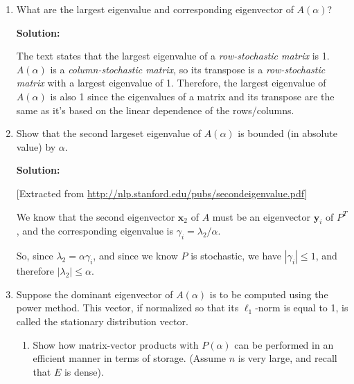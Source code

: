 \documentclass[12pt]{article}
\newcommand{\abs}[1]{\left| #1 \right|}
\newcommand{\vect}{\mathbf}
\begin{document}
\begin{enumerate}
\begin{enumerate}
  {\bf Solution:}

  We can write any arbitrary element of each matrix in the above given equation, giving

  \begin{align*}
    A_{i,j} &= \alpha P_{i,j} + (1 - \alpha) E_{i,j}\\
    \intertext{Now in taking a summation of an arbitrary column from above}
    \sum_{i=1}^{n}A_{i,j} &= \alpha \sum_{i=1}^{n}P_{i,j} + (1-\alpha)\sum_{i=1}^{n}E_{i,j}\\
    &= \alpha + (1 - \alpha) = 1
  \end{align*}

  Which is due to the fact that $E$ and $P$ are column-stochastic matrices.

  \item What are the largest eigenvalue and corresponding eigenvector of $A(\alpha)$?

  {\bf Solution:}

  The text states that the largest eigenvalue of a {\em row-stochastic matrix} is 1. $A(\alpha)$
  is a {\em column-stochastic matrix}, so its transpose is a {\em row-stochastic matrix}
  with a largest eigenvalue of 1. Therefore, the largest eigenvalue of $A(\alpha)$ is
  also 1 since the eigenvalues of a matrix and its transpose are the same as it's based
  on the linear dependence of the rows/columns.

  \item Show that the second largeset eigenvalue of $A(\alpha)$ is bounded (in absolute value)
  by $\alpha$.

  {\bf Solution:}

    [Extracted from \url{http://nlp.stanford.edu/pubs/secondeigenvalue.pdf}]

    We know that the second eigenvector $\vect{x}_{2}$ of $A$ must be an eigenvector
    $\vect{y}_{i}$ of $P^{T}$, and the corresponding eigenvalue is $\gamma_{i} = \lambda_{2}/\alpha$.

    So, since $\lambda_{2} = \alpha \gamma_{i}$, and since we know $P$ is stochastic,
    we have $\abs{\gamma_{i}} \leq 1$, and therefore $\abs{\lambda_{2}} \leq \alpha$.


  \item Suppose the dominant eigenvector of $A(\alpha)$ is to be computed using
  the power method. This vector, if normalized so that its $\ell_{1}$-norm is
  equal to 1, is called the stationary distribution vector.

  \begin{enumerate}
    \item Show how matrix-vector products with $P(\alpha)$ can be performed in an
    efficient manner in terms of storage. (Assume $n$ is very large, and recall
    that $E$ is dense).


\end{enumerate}
\end{enumerate}
\end{enumerate}
\end{document}
